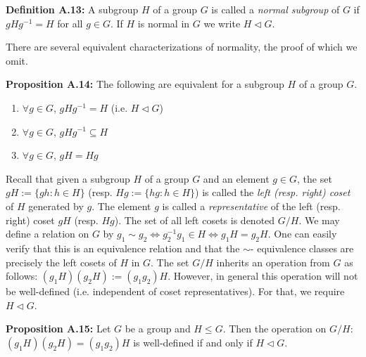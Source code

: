 \documentclass[12pt]{article}
\newcommand{\vs}{\vskip10pt}
\begin{document}
	\vs 
	
	\textbf{Definition A.13: } A subgroup $H$ of a group $G$ is called a \textit{normal subgroup} of $G$ if $gHg^{-1} = H$ for all $g \in G$. If $H$ is normal in $G$ we write $H \triangleleft G$.
	
	\vs 
	
	There are several equivalent characterizations of normality, the proof of which we omit. 
	
	\vs 
	
	\textbf{Proposition A.14: } The following are equivalent for a subgroup $H$ of a group $G$. 
	
	\begin{enumerate}[label = (\alph*)]
		\item $\forall g \in G$, $gHg^{-1} = H$ (i.e. $H \triangleleft G$)
		\item $\forall g \in G$, $gHg^{-1} \subseteq H$
		\item $\forall g \in G$, $gH = Hg$
	\end{enumerate}
	
	\vs 
	
	Recall that given a subgroup $H$ of a group $G$ and an element $g \in G$, the set $gH := \{gh: h \in H\}$ (resp. $Hg := \{hg: h \in H\}$) is called the \textit{left (resp. right) coset} of $H$ generated by $g$. The element $g$ is called a \textit{representative} of the left (resp. right) coset $gH$ (resp. $Hg$). The set of all left cosets is denoted $G/H$. We may define a relation on $G$ by $g_1 \sim g_2 \iff g_2^{-1} g_1 \in H \iff g_1 H = g_2 H$. One can easily verify that this is an equivalence relation and that the $\sim$- equivalence classes are precisely the left cosets of $H$ in $G$. The set $G/H$ inherits an operation from $G$ as follows: $(g_1H)(g_2H) := (g_1 g_2)H$. However, in general this operation will not be well-defined (i.e. independent of coset representatives). For that, we require $H \triangleleft G$. 
	
	\vs
	
	\textbf{Proposition A.15: } Let $G$ be a group and $H \leq G$. Then the operation on $G/H$: $(g_1 H) (g_2 H) = (g_1 g_2) H$ is well-defined if and only if $H \triangleleft G$. 
	
\end{document}
